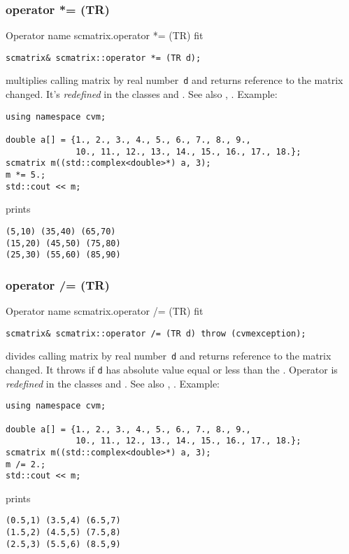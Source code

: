\subsubsection{operator *= (TR)}
Operator%
\pdfdest name {scmatrix.operator *= (TR)} fit
\begin{verbatim}
scmatrix& scmatrix::operator *= (TR d);
\end{verbatim}
multiplies  calling matrix by  real number~\verb"d"
and returns  reference to
the matrix changed.
It's \emph{redefined} in the classes
and .
See also ,
.
Example:
\begin{Verbatim}
using namespace cvm;

double a[] = {1., 2., 3., 4., 5., 6., 7., 8., 9.,
              10., 11., 12., 13., 14., 15., 16., 17., 18.};
scmatrix m((std::complex<double>*) a, 3);
m *= 5.;
std::cout << m;
\end{Verbatim}
prints
\begin{Verbatim}
(5,10) (35,40) (65,70)
(15,20) (45,50) (75,80)
(25,30) (55,60) (85,90)
\end{Verbatim}
\newpage



\subsubsection{operator /= (TR)}
Operator%
\pdfdest name {scmatrix.operator /= (TR)} fit
\begin{verbatim}
scmatrix& scmatrix::operator /= (TR d) throw (cvmexception);
\end{verbatim}
divides  calling matrix by  real number~\verb"d"
and returns  reference to
the matrix changed.
It throws  
if \verb"d" has  absolute value equal or less
than the 
.
Operator is \emph{redefined} in the classes
and .
See also ,
.
Example:
\begin{Verbatim}
using namespace cvm;

double a[] = {1., 2., 3., 4., 5., 6., 7., 8., 9.,
              10., 11., 12., 13., 14., 15., 16., 17., 18.};
scmatrix m((std::complex<double>*) a, 3);
m /= 2.;
std::cout << m;
\end{Verbatim}
prints
\begin{Verbatim}
(0.5,1) (3.5,4) (6.5,7)
(1.5,2) (4.5,5) (7.5,8)
(2.5,3) (5.5,6) (8.5,9)
\end{Verbatim}
\newpage




